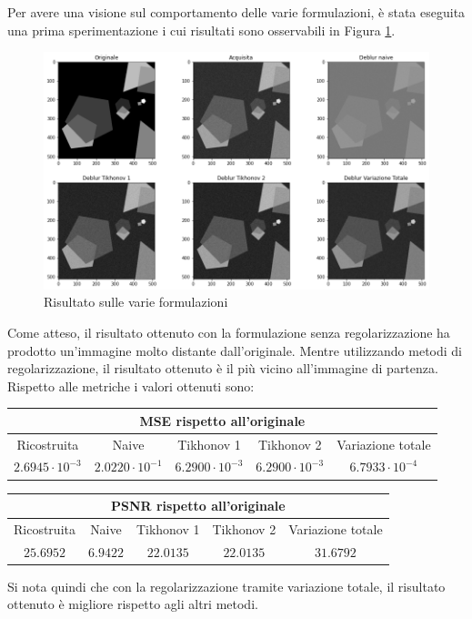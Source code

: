 \documentclass[11pt]{article}
\begin{document}
Per avere una visione sul comportamento delle varie formulazioni, è stata eseguita una prima sperimentazione i cui risultati sono osservabili in Figura \ref{fig:deblur1}.\\
\begin{figure}[H]
    \centering
    \includegraphics[width=15cm]{deblur1.png}
    \caption{Risultato sulle varie formulazioni}
    \label{fig:deblur1}
\end{figure}
Come atteso, il risultato ottenuto con la formulazione senza regolarizzazione ha prodotto un'immagine molto distante dall'originale. 
Mentre utilizzando metodi di regolarizzazione, il risultato ottenuto è il più vicino all'immagine di partenza. \\
Rispetto alle metriche i valori ottenuti sono:
\begin{center}
    \begin{tabular}{ |c|c|c|c|c| }
    \hline
    \multicolumn{5}{|c|}{MSE rispetto all'originale} \\
    \hline
    Ricostruita & Naive & Tikhonov 1 & Tikhonov 2 & Variazione totale \\ 
    $2.6945 \cdot 10^{-3}$ & $2.0220 \cdot 10^{-1}$ & $6.2900 \cdot 10^{-3}$ & $6.2900 \cdot 10^{-3}$ & $6.7933 \cdot 10^{-4}$ \\ 
    \hline
    \end{tabular}
\end{center}
\begin{center}
    \begin{tabular}{ |c|c|c|c|c| }
    \hline
    \multicolumn{5}{|c|}{PSNR rispetto all'originale} \\
    \hline
    Ricostruita & Naive & Tikhonov 1 & Tikhonov 2 & Variazione totale \\ 
    $25.6952$ & $6.9422$ & $22.0135$ & $22.0135$ & $31.6792$ \\ 
    \hline
    \end{tabular}
\end{center}
Si nota quindi che con la regolarizzazione tramite variazione totale, il risultato ottenuto è migliore rispetto agli altri metodi.
\end{document}
